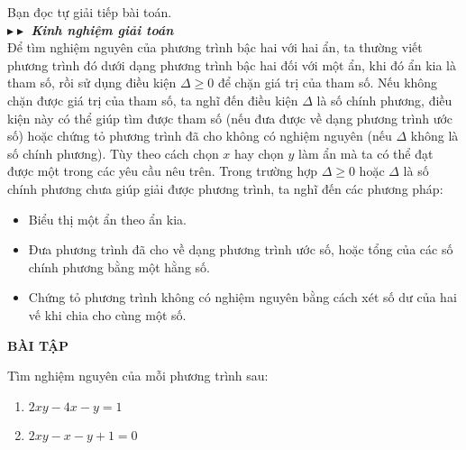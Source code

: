 \begin{vd}
{    Bạn đọc tự giải tiếp bài toán.\\
    $\blacktriangleright\blacktriangleright$ \textbf{\textit{Kinh nghiệm giải toán}}\\
    Để tìm nghiệm nguyên của phương trình bậc hai với hai ẩn, ta thường viết phương trình đó dưới dạng phương trình bậc hai đối với một ẩn, khi đó ẩn kia là tham số, rồi sử dụng điều kiện $\Delta \ge 0$ để chặn giá trị của tham số.
    Nếu không chặn được giá trị của tham số, ta nghĩ đến điều kiện $\Delta$ là số chính phương, điều kiện này có thể giúp tìm được tham số (nếu đưa được về dạng phương trình ước số) hoặc chứng tỏ phương trình đã cho không có nghiệm nguyên (nếu $\Delta$ không là số chính phương).
    Tùy theo cách chọn $x$ hay chọn $y$ làm ẩn mà ta có thể đạt được một trong các yêu cầu nêu trên.
    Trong trường hợp $\Delta \ge 0$ hoặc $\Delta $ là số chính phương chưa giúp giải được phương trình, ta nghĩ đến các phương pháp:
    \begin{itemize}
    \item Biểu thị một ẩn theo ẩn kia.
    \item Đưa phương trình đã cho về dạng phương trình ước số,  hoặc tổng của các số chính phương bằng một hằng số.
    \item Chứng tỏ phương trình không có nghiệm nguyên bằng cách xét số dư của hai vế khi chia cho cùng một số.
\end{itemize}                      
    }
\end{vd}
\begin{center}
    \textbf{BÀI TẬP}
\end{center}

\begin{bt}
    Tìm nghiệm nguyên của mỗi phương trình sau:
    \begin{multicols}{2}\begin{enumerate}
        \item $2xy-4x-y=1$
        \item $2xy-x-y+1=0$
\end{enumerate}\end{multicols}
\end{bt}

